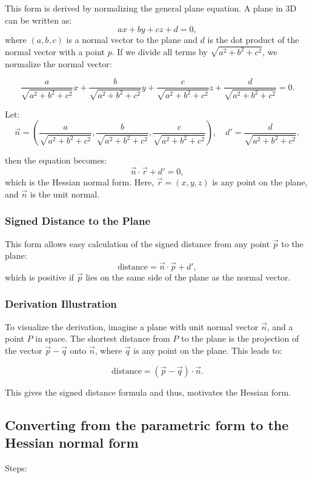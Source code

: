 This form is derived by normalizing the general plane equation. A plane in 3D can be written as:
\[
	ax + by + cz + d = 0,
\]
where \((a, b, c)\) is a normal vector to the plane and \(d\) is the dot product of the normal vector with a point \(p\).
If we divide all terms by \(\sqrt{a^2 + b^2 + c^2}\), we normalize the normal vector:

\[
	\frac{a}{\sqrt{a^2 + b^2 + c^2}}x + \frac{b}{\sqrt{a^2 + b^2 + c^2}}y + \frac{c}{\sqrt{a^2 + b^2 + c^2}}z + \frac{d}{\sqrt{a^2 + b^2 + c^2}} = 0.
\]

Let:
\[
	\vec{n} = \left(\frac{a}{\sqrt{a^2 + b^2 + c^2}}, \frac{b}{\sqrt{a^2 + b^2 + c^2}}, \frac{c}{\sqrt{a^2 + b^2 + c^2}}\right), \quad d' = \frac{d}{\sqrt{a^2 + b^2 + c^2}},
\]

then the equation becomes:
\[
	\vec{n} \cdot \vec{r} + d' = 0,
\]
which is the Hessian normal form. Here, \(\vec{r} = (x, y, z)\) is any point on the plane, and \(\vec{n}\) is the unit normal.

\subsubsection{Signed Distance to the Plane}

This form allows easy calculation of the signed distance from any point \(\vec{p}\) to the plane:
\[
	\text{distance} = \vec{n} \cdot \vec{p} + d',
\]
which is positive if \(\vec{p}\) lies on the same side of the plane as the normal vector.

\subsubsection{Derivation Illustration}

To visualize the derivation, imagine a plane with unit normal vector \(\vec{n}\), and a point \(P\) in space. The shortest distance from \(P\) to the plane is the projection of the vector \(\vec{p} - \vec{q}\) onto \(\vec{n}\), where \(\vec{q}\) is any point on the plane. This leads to:

\[
	\text{distance} = (\vec{p} - \vec{q}) \cdot \vec{n}.
\]

This gives the signed distance formula and thus, motivates the Hessian form.

\subsection{Converting from the parametric form to the Hessian normal form}
Steps:

